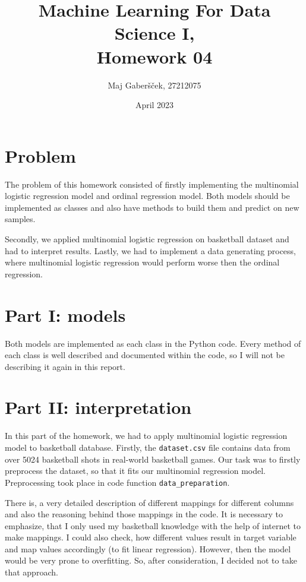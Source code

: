 \documentclass{article}
\title{Machine Learning For Data Science I, \\[0.1cm] Homework 04}
\author{Maj Gaberšček, 27212075}
\date{April 2023}
\begin{document}
\maketitle

\section*{Problem}

The problem of this homework consisted of firstly implementing the multinomial logistic regression model and ordinal regression model. Both models should be implemented as classes and also have methods to build them and predict on new samples.

Secondly, we applied multinomial logistic regression on basketball dataset and had to interpret results. Lastly, we had to implement a data generating process, where multinomial logistic regression would perform worse then the ordinal regression.

\section{Part I: models}

Both models are implemented as each class in the Python code. Every method of each class is well described and documented within the code, so I will not be describing it again in this report.

\section{Part II: interpretation}

In this part of the homework, we had to apply multinomial logistic regression model to basketball database. Firstly, the \texttt{dataset.csv} file contains data from over 5024 basketball shots in real-world basketball games. Our task was to firstly preprocess the dataset, so that it fits our multinomial regression model. Preprocessing took place in code function \texttt{data\_preparation}.

There is, a very detailed description of different mappings for different columns and also the reasoning behind those mappings in the code. It is necessary to emphasize, that I only used my basketball knowledge with the help of internet to make mappings. I could also check, how different values result in target variable and map values accordingly (to fit linear regression). However, then the model would be very prone to overfitting. So, after consideration, I decided not to take that approach.
\end{document}
